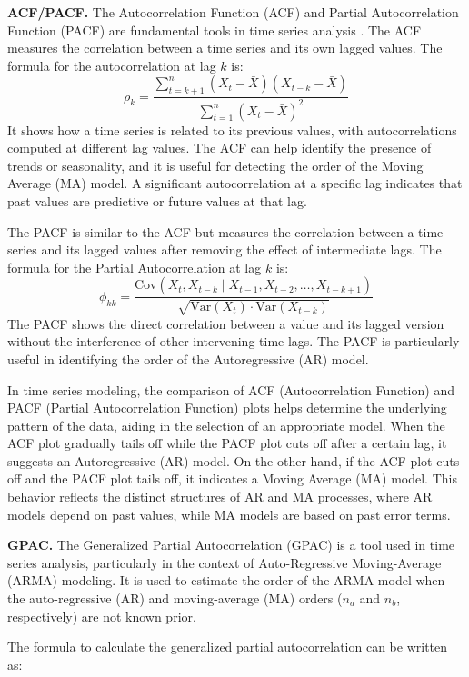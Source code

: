 \documentclass{scrartcl}
\begin{document}
\textbf{ACF/PACF.}
The Autocorrelation Function (ACF) and Partial Autocorrelation Function (PACF) are fundamental tools in time series analysis \cite{box2015time, hyndman2018forecasting, chatfield2019analysis}. The ACF measures the correlation between a time series and its own lagged values. The formula for the autocorrelation at lag \(k\) is:
\[
\rho_k = \frac{\sum_{t=k+1}^{n} (X_t - \bar{X})(X_{t-k} - \bar{X})}{\sum_{t=1}^{n} (X_t - \bar{X})^2}
\]It shows how a time series is related to its previous values, with autocorrelations computed at different lag values. 
The ACF can help identify the presence of trends or seasonality, and it is useful for detecting the order of the Moving Average (MA) model. A significant autocorrelation at a specific lag indicates that past values are predictive or future values at that lag. 

The PACF is similar to the ACF but measures the correlation between a time series and its lagged values after removing the effect of intermediate lags. The formula for the Partial Autocorrelation at lag \( k \) is:
\[
\phi_{kk} = \frac{\text{Cov}(X_t, X_{t-k} \mid X_{t-1}, X_{t-2}, \dots, X_{t-k+1})}{\sqrt{\text{Var}(X_t) \cdot \text{Var}(X_{t-k})}}
\]The PACF shows the direct correlation between a value and its lagged version without the interference of other intervening time lags. The PACF is particularly useful in identifying the order of the Autoregressive (AR) model. 

In time series modeling, the comparison of ACF (Autocorrelation Function) and PACF (Partial Autocorrelation Function) plots helps determine the underlying pattern of the data, aiding in the selection of an appropriate model. When the ACF plot gradually tails off while the PACF plot cuts off after a certain lag, it suggests an Autoregressive (AR) model. On the other hand, if the ACF plot cuts off and the PACF plot tails off, it indicates a Moving Average (MA) model. This behavior reflects the distinct structures of AR and MA processes, where AR models depend on past values, while MA models are based on past error terms. 


\textbf{GPAC.}
The Generalized Partial Autocorrelation (GPAC) is a tool used in time series analysis, particularly in the context of Auto-Regressive Moving-Average (ARMA) modeling. It is used to estimate the order of the ARMA model when the auto-regressive (AR) and moving-average (MA) orders (\( n_a \) and \( n_b \), respectively) are not known prior.

The formula to calculate the generalized partial autocorrelation can be written as:
\end{document}
